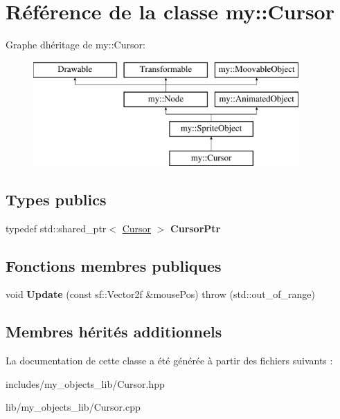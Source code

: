 \hypertarget{classmy_1_1Cursor}{}\section{Référence de la classe my\+:\+:Cursor}
\label{classmy_1_1Cursor}
Graphe d\textquotesingle{}héritage de my\+:\+:Cursor\+:\begin{figure}[H]
\begin{center}
\leavevmode
\includegraphics[height=4.000000cm]{classmy_1_1Cursor}
\end{center}
\end{figure}
\subsection*{Types publics}
\begin{DoxyCompactItemize}
\item 
\mbox{\label{classmy_1_1Cursor_afbf71f356d765e088f505464bcfac84a}} 
typedef std\+::shared\+\_\+ptr$<$ \hyperlink{classmy_1_1Cursor}{Cursor} $>$ {\bfseries Cursor\+Ptr}
\end{DoxyCompactItemize}
\subsection*{Fonctions membres publiques}
\begin{DoxyCompactItemize}
\item 
\mbox{\label{classmy_1_1Cursor_abe2aa1caac7aca369c8d8383458323d1}} 
void {\bfseries Update} (const sf\+::\+Vector2f \&mouse\+Pos)  throw (std\+::out\+\_\+of\+\_\+range)
\end{DoxyCompactItemize}
\subsection*{Membres hérités additionnels}


La documentation de cette classe a été générée à partir des fichiers suivants \+:\begin{DoxyCompactItemize}
\item 
includes/my\+\_\+objects\+\_\+lib/Cursor.\+hpp\item 
lib/my\+\_\+objects\+\_\+lib/Cursor.\+cpp\end{DoxyCompactItemize}
